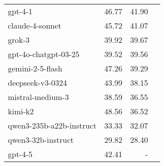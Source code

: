 \begin{tabular}{l|D{2}{2} D{2}{2}|c}
  gpt-4-1                            & 46.77          & 41.90           & \n                                      \\
  claude-4-sonnet                    & 45.72          & 41.07           & \n                                      \\
  grok-3                             & 39.92          & 39.67           & \n                                      \\
  gpt-4o-chatgpt-03-25               & 39.52          & 39.56           & \n                                      \\
  gemini-2-5-flash                   & 47.26          & 39.29           & \n                                      \\
  deepseek-v3-0324                   & 43.99          & 38.15           & \n                                      \\
  mistral-medium-3                   & 38.59          & 36.55           & \n                                      \\
  kimi-k2                            & 48.56          & 36.52           & \n                                      \\
  qwen3-235b-a22b-instruct           & 33.33          & 32.07           & \n                                      \\
  qwen3-32b-instruct                 & 29.82          & 28.40           & \n                                      \\
  gpt-4-5                            & 42.41          & {-}             & \n
\end{tabular}
